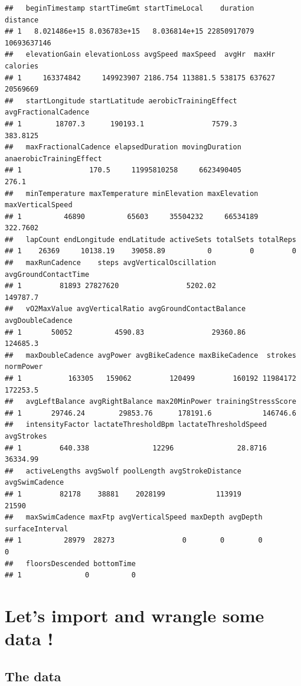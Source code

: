 \documentclass[
]{book}
\begin{document}
\begin{verbatim}
##   beginTimestamp startTimeGmt startTimeLocal    duration    distance
## 1   8.021486e+15 8.036783e+15   8.036814e+15 22850917079 10693637146
##   elevationGain elevationLoss avgSpeed maxSpeed  avgHr  maxHr calories
## 1     163374842     149923907 2186.754 113881.5 538175 637627 20569669
##   startLongitude startLatitude aerobicTrainingEffect avgFractionalCadence
## 1        18707.3      190193.1                7579.3             383.8125
##   maxFractionalCadence elapsedDuration movingDuration anaerobicTrainingEffect
## 1                170.5     11995810258     6623490405                   276.1
##   minTemperature maxTemperature minElevation maxElevation maxVerticalSpeed
## 1          46890          65603     35504232     66534189         322.7602
##   lapCount endLongitude endLatitude activeSets totalSets totalReps
## 1    26369     10138.19    39058.89          0         0         0
##   maxRunCadence    steps avgVerticalOscillation avgGroundContactTime
## 1         81893 27827620                5202.02             149787.7
##   vO2MaxValue avgVerticalRatio avgGroundContactBalance avgDoubleCadence
## 1       50052          4590.83                29360.86         124685.3
##   maxDoubleCadence avgPower avgBikeCadence maxBikeCadence  strokes normPower
## 1           163305   159062         120499         160192 11984172  172253.5
##   avgLeftBalance avgRightBalance max20MinPower trainingStressScore
## 1       29746.24        29853.76      178191.6            146746.6
##   intensityFactor lactateThresholdBpm lactateThresholdSpeed avgStrokes
## 1         640.338               12296               28.8716   36334.99
##   activeLengths avgSwolf poolLength avgStrokeDistance avgSwimCadence
## 1         82178    38881    2028199            113919          21590
##   maxSwimCadence maxFtp avgVerticalSpeed maxDepth avgDepth surfaceInterval
## 1          28979  28273                0        0        0               0
##   floorsDescended bottomTime
## 1               0          0
\end{verbatim}

\hypertarget{lets-import-and-wrangle-some-data}{%
\section{Let's import and wrangle some data !}\label{lets-import-and-wrangle-some-data}}

\hypertarget{the-data}{%
\subsection{The data}\label{the-data}}
\end{document}
